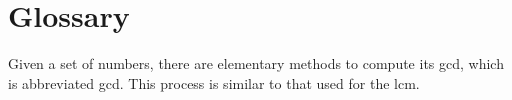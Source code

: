 \chapter{Glossary}
 
 

Given a set of numbers, there are elementary methods to compute 
its \acrlong{gcd}, which is abbreviated \acrshort{gcd}. This process 
is similar to that used for the \acrfull{lcm}.
 
 
